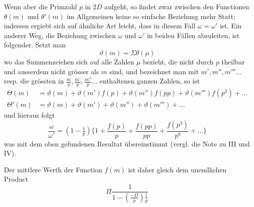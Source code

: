 Wenn aber die Primzahl $p$ in $2D$ aufgeht, so findet zwar zwischen den Functionen $\theta(m)$ und $\theta'(m)$ im Allgemeinen keine so einfache Beziehung mehr Statt; indessen ergiebt sich auf ähnliche Art leicht, dass in diesem Fall $\omega=\omega'$ ist. Ein anderer Weg, die Beziehung zwischen $\omega$ und $\omega'$ in beiden Fällen abzuleiten, ist folgender. Setzt man
\[
\vartheta(m)=\Sigma\theta(\mu)
\]
wo das Summenzeichen sich auf alle Zahlen $\mu$ bezieht, die nicht durch $p$ theilbar und ausserdem nicht grösser als $m$ sind, und bezeichnet man mit $m',m'',m'''\ldots$ resp. die grössten in $\frac mp,\frac{m'}p,\frac{m''}p\ldots$ enthaltenen ganzen Zahlen, so ist
\[
\begin{aligned}
\Theta(m)&=\vartheta(m)+\vartheta(m')f(p)+\vartheta(m'')f(pp)+\vartheta(m''')f(p^3)+\ldots\\
\Theta'(m)&=\vartheta(m)+\vartheta(m')+\vartheta(m'')+\vartheta(m''')+\ldots
\end{aligned}
\]
und hieraus folgt
\[
\frac\omega{\omega'}=(1-\tfrac1p)\{1+\frac{f(p)}p+\frac{f(pp)}{pp}+\frac{f(p^3)}{p^8}+\ldots\}
\]
was mit dem oben gefundenen Resultat übereinstimmt (vergl. die Note zu III und IV).

Der mittlere Werth der Function $f(m)$ ist daher gleich dem unendlichen Product
\[
\Pi\frac1{1-\left(\frac{-D}p\right)\frac1p}
\]

